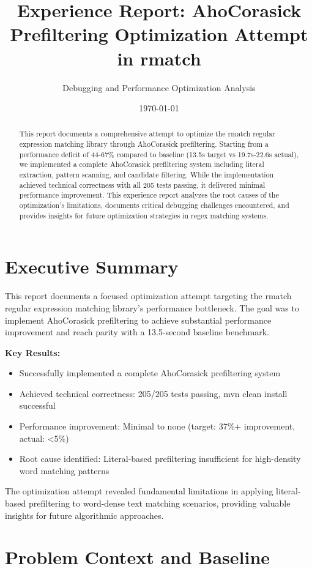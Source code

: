 \documentclass[11pt,a4paper]{article}
\title{Experience Report: AhoCorasick Prefiltering Optimization Attempt in rmatch}
\author{Debugging and Performance Optimization Analysis}
\date{\today}
\begin{document}
\maketitle

\begin{abstract}
This report documents a comprehensive attempt to optimize the rmatch regular expression matching library through AhoCorasick prefiltering. Starting from a performance deficit of 44-67\% compared to baseline (13.5s target vs 19.7s-22.6s actual), we implemented a complete AhoCorasick prefiltering system including literal extraction, pattern scanning, and candidate filtering. While the implementation achieved technical correctness with all 205 tests passing, it delivered minimal performance improvement. This experience report analyzes the root causes of the optimization's limitations, documents critical debugging challenges encountered, and provides insights for future optimization strategies in regex matching systems.
\end{abstract}

\section{Executive Summary}

This report documents a focused optimization attempt targeting the rmatch regular expression matching library's performance bottleneck. The goal was to implement AhoCorasick prefiltering to achieve substantial performance improvement and reach parity with a 13.5-second baseline benchmark.

\textbf{Key Results:}
\begin{itemize}
\item Successfully implemented a complete AhoCorasick prefiltering system
\item Achieved technical correctness: 205/205 tests passing, mvn clean install successful
\item Performance improvement: Minimal to none (target: 37\%+ improvement, actual: <5\%)
\item Root cause identified: Literal-based prefiltering insufficient for high-density word matching patterns
\end{itemize}

The optimization attempt revealed fundamental limitations in applying literal-based prefiltering to word-dense text matching scenarios, providing valuable insights for future algorithmic approaches.

\section{Problem Context and Baseline}
\end{document}
